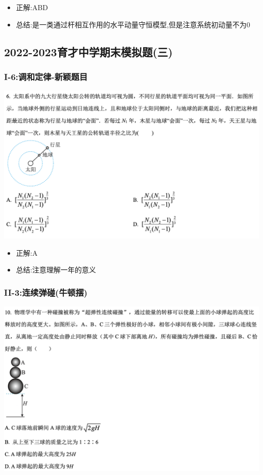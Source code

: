 \documentclass{article}
\begin{document}
\begin{itemize}
    \item 正解:\quad ABD
    \item 总结:\quad 是一类通过杆相互作用的水平动量守恒模型,但是注意系统初动量不为0
\end{itemize}

\vspace{2em}

\subsection{2022-2023育才中学期末模拟题(三)}
\subsubsection{I-6:调和定律-新颖题目}

\includegraphics[width=50em,keepaspectratio]{./pictures/1.5-2.png}

\begin{itemize}
    \item 正解:\quad A
    \item 总结:\quad 注意理解一年的意义
\end{itemize}

\subsubsection{II-3:连续弹碰(牛顿摆)}

\includegraphics[width=50em,keepaspectratio]{./pictures/1.5-3.png}
\end{document}
